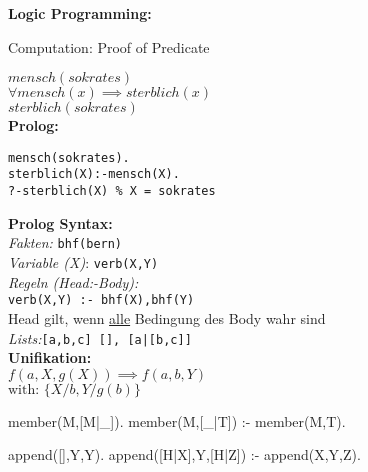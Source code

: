\begin{breakbox}
\textbf{Logic Programming:}
\begin{mdframed}
  \begin{center}
  	Computation: Proof of Predicate 
  \end{center}
\end{mdframed}

$mensch(sokrates)$ \\
$\forall mensch(x) \implies sterblich(x)$ \\
$sterblich(sokrates)$\\

\textbf{Prolog:}
\vspace{-5mm}
\begin{verbatim}
mensch(sokrates).
sterblich(X):-mensch(X).
?-sterblich(X) % X = sokrates
\end{verbatim}
\textbf{Prolog Syntax:}\\
\emph{Fakten:} \texttt{bhf(bern)}\\
\emph{Variable (X)}: \texttt{verb(X,Y)}\\
\emph{Regeln (Head:-Body):}\\ \texttt{verb(X,Y) :- bhf(X),bhf(Y)}\\
Head gilt, wenn \underline{alle} Bedingung des Body wahr sind\\
\emph{Lists:}\texttt{[a,b,c] [], [a|[b,c]]}\\

\textbf{Unifikation:}\\
$f(a,X,g(X)) \implies f(a,b,Y)$\\
$\text{with: } \{X/b, Y/g(b)\}$\\

\begin{prologcode}

member(M,[M|_]).
member(M,[_|T]) :- member(M,T).

append([],Y,Y).
append([H|X],Y,[H|Z]) :- append(X,Y,Z).


\end{prologcode}
\end{breakbox}
